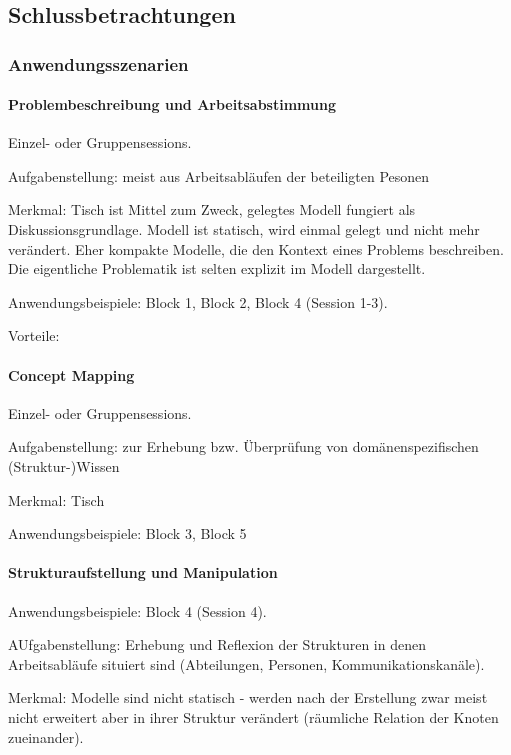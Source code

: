 \part*{}

\chapter{Schlussbetrachtungen} %
\label{cha:schlussbetrachtungen}

\section{Anwendungsszenarien} %
\label{sec:anwendungsszenarien}

\subsection{Problembeschreibung und Arbeitsabstimmung}

Einzel- oder Gruppensessions. 

Aufgabenstellung: meist aus Arbeitsabläufen der beteiligten Pesonen

Merkmal: Tisch ist Mittel zum Zweck, gelegtes Modell fungiert als Diskussionsgrundlage. Modell ist statisch, wird einmal gelegt und nicht mehr verändert. Eher kompakte Modelle, die den Kontext eines Problems beschreiben. Die eigentliche Problematik ist selten explizit im Modell dargestellt.

Anwendungsbeispiele: Block 1, Block 2, Block 4 (Session 1-3).

Vorteile:

\subsection{Concept Mapping}

Einzel- oder Gruppensessions. 

Aufgabenstellung: zur Erhebung bzw. Überprüfung von domänenspezifischen (Struktur-)Wissen

Merkmal: Tisch 

Anwendungsbeispiele: Block 3, Block 5

\subsection{Strukturaufstellung und Manipulation}

Anwendungsbeispiele: Block 4 (Session 4).

AUfgabenstellung: Erhebung und Reflexion der Strukturen in denen Arbeitsabläufe situiert sind (Abteilungen, Personen, Kommunikationskanäle).

Merkmal: Modelle sind nicht statisch - werden nach der Erstellung zwar meist nicht erweitert aber in ihrer Struktur verändert (räumliche Relation der Knoten zueinander). 

